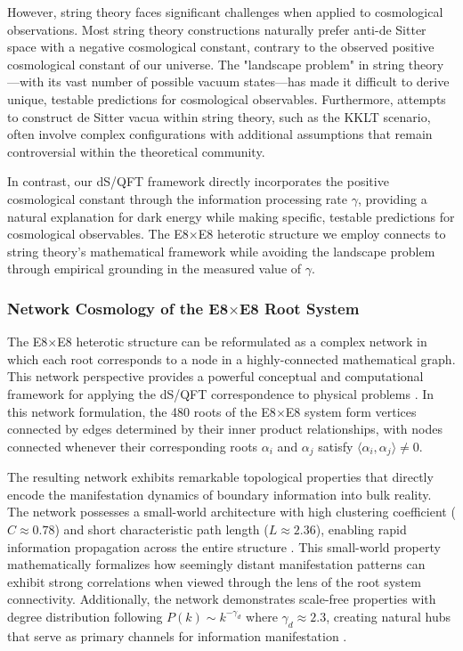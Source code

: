 \documentclass[11pt,english,twoside]{article}
\theoremstyle{plain}
\theoremstyle{definition}
\theoremstyle{remark}
\newcommand{\gammaR}{\gamma}
\begin{document}
However, string theory faces significant challenges when applied to cosmological observations. Most string theory constructions naturally prefer anti-de Sitter space with a negative cosmological constant, contrary to the observed positive cosmological constant of our universe. The "landscape problem" in string theory—with its vast number of possible vacuum states—has made it difficult to derive unique, testable predictions for cosmological observables. Furthermore, attempts to construct de Sitter vacua within string theory, such as the KKLT scenario, often involve complex configurations with additional assumptions that remain controversial within the theoretical community.

In contrast, our dS/QFT framework directly incorporates the positive cosmological constant through the information processing rate $\gammaR$, providing a natural explanation for dark energy while making specific, testable predictions for cosmological observables. The E8$\times$E8 heterotic structure we employ connects to string theory's mathematical framework while avoiding the landscape problem through empirical grounding in the measured value of $\gammaR$.

\subsubsection{Network Cosmology of the E8$\times$E8 Root System}

The E8$\times$E8 heterotic structure can be reformulated as a complex network in which each root corresponds to a node in a highly-connected mathematical graph. This network perspective provides a powerful conceptual and computational framework for applying the dS/QFT correspondence to physical problems \cite{Barabasi2016,Newman2010}. In this network formulation, the 480 roots of the E8$\times$E8 system form vertices connected by edges determined by their inner product relationships, with nodes connected whenever their corresponding roots $\alpha_i$ and $\alpha_j$ satisfy $\langle\alpha_i,\alpha_j\rangle \neq 0$.

The resulting network exhibits remarkable topological properties that directly encode the manifestation dynamics of boundary information into bulk reality. The network possesses a small-world architecture with high clustering coefficient ($C \approx 0.78$) and short characteristic path length ($L \approx 2.36$), enabling rapid information propagation across the entire structure \cite{Strogatz2001}. This small-world property mathematically formalizes how seemingly distant manifestation patterns can exhibit strong correlations when viewed through the lens of the root system connectivity. Additionally, the network demonstrates scale-free properties with degree distribution following $P(k) \sim k^{-\gamma_d}$ where $\gamma_d \approx 2.3$, creating natural hubs that serve as primary channels for information manifestation \cite{Albert2002}.
\end{document}
